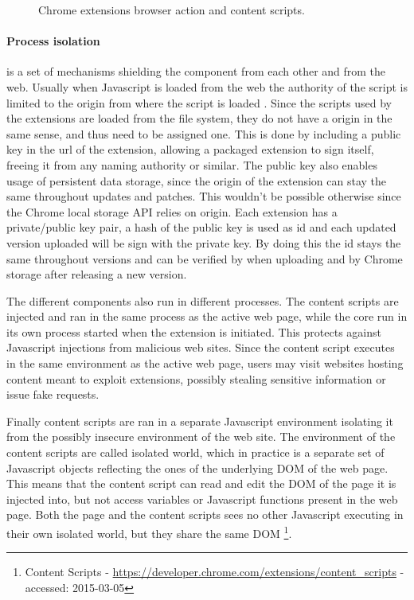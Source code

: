 \begin{figure}[ht]
    \caption{Chrome extensions browser action and content scripts.}
    \label{extension-ux}
\end{figure}

\paragraph{Process isolation} is a set of mechanisms shielding the component from each other and from the web. Usually when Javascript is loaded from the web the authority of the script is limited to the origin from where the script is loaded \cite{protecting-browsers}. Since the scripts used by the extensions are loaded from the file system, they do not have a origin in the same sense, and thus need to be assigned one. This is done by including a public key in the url of the extension, allowing a packaged extension to sign itself, freeing it from any naming authority or similar. The public key also enables usage of persistent data storage, since the origin of the extension can stay the same throughout updates and patches. This wouldn't be possible otherwise since the Chrome local storage API relies on origin. Each extension has a private/public key pair, a hash of the public key is used as id and each updated version uploaded will be sign with the private key. By doing this the id stays the same throughout versions and can be verified by when uploading and by Chrome storage after releasing a new version. 


\par The different components also run in different processes. The content scripts are injected and ran in the same process as the active web page, while the core run in its own process started when the extension is initiated. This protects against Javascript injections from malicious web sites\cite{javascript-injection}. Since the content script executes in the same environment as the active web page, users may visit websites hosting content meant to exploit extensions\cite{carlini-chrome}, possibly stealing sensitive information or issue fake requests.
\par Finally content scripts are ran in a separate Javascript environment isolating it from the possibly insecure environment of the web site. The environment of the content scripts are called isolated world, which in practice is a separate set of Javascript objects reflecting the ones of the underlying DOM of the web page. This means that the content script can read and edit the DOM of the page it is injected into, but not access variables or Javascript functions present in the web page. Both the page and the content scripts sees no other Javascript executing in their own isolated world, but they share the same DOM \footnote{Content Scripts - \url{https://developer.chrome.com/extensions/content_scripts} - accessed: 2015-03-05}.


